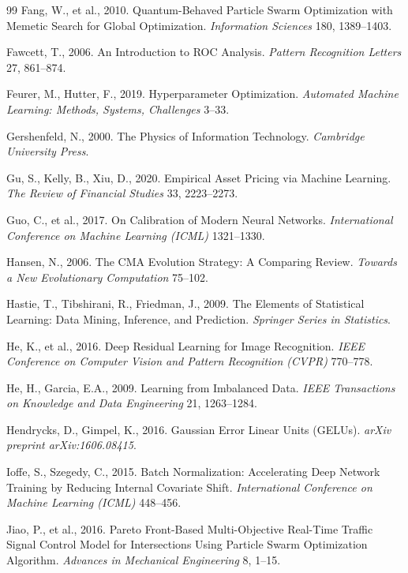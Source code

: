 \begin{thebibliography}{99}
Fang, W., et al., 2010. Quantum-Behaved Particle Swarm Optimization with Memetic Search for Global Optimization. \textit{Information Sciences} 180, 1389–1403.

Fawcett, T., 2006. An Introduction to ROC Analysis. \textit{Pattern Recognition Letters} 27, 861–874.

Feurer, M., Hutter, F., 2019. Hyperparameter Optimization. \textit{Automated Machine Learning: Methods, Systems, Challenges} 3–33.

Gershenfeld, N., 2000. The Physics of Information Technology. \textit{Cambridge University Press}.

Gu, S., Kelly, B., Xiu, D., 2020. Empirical Asset Pricing via Machine Learning. \textit{The Review of Financial Studies} 33, 2223–2273.

Guo, C., et al., 2017. On Calibration of Modern Neural Networks. \textit{International Conference on Machine Learning (ICML)} 1321–1330.

Hansen, N., 2006. The CMA Evolution Strategy: A Comparing Review. \textit{Towards a New Evolutionary Computation} 75–102.

Hastie, T., Tibshirani, R., Friedman, J., 2009. The Elements of Statistical Learning: Data Mining, Inference, and Prediction. \textit{Springer Series in Statistics}.

He, K., et al., 2016. Deep Residual Learning for Image Recognition. \textit{IEEE Conference on Computer Vision and Pattern Recognition (CVPR)} 770–778.

He, H., Garcia, E.A., 2009. Learning from Imbalanced Data. \textit{IEEE Transactions on Knowledge and Data Engineering} 21, 1263–1284.

Hendrycks, D., Gimpel, K., 2016. Gaussian Error Linear Units (GELUs). \textit{arXiv preprint arXiv:1606.08415}.

Ioffe, S., Szegedy, C., 2015. Batch Normalization: Accelerating Deep Network Training by Reducing Internal Covariate Shift. \textit{International Conference on Machine Learning (ICML)} 448–456.

Jiao, P., et al., 2016. Pareto Front-Based Multi-Objective Real-Time Traffic Signal Control Model for Intersections Using Particle Swarm Optimization Algorithm. \textit{Advances in Mechanical Engineering} 8, 1–15.


\end{thebibliography}
